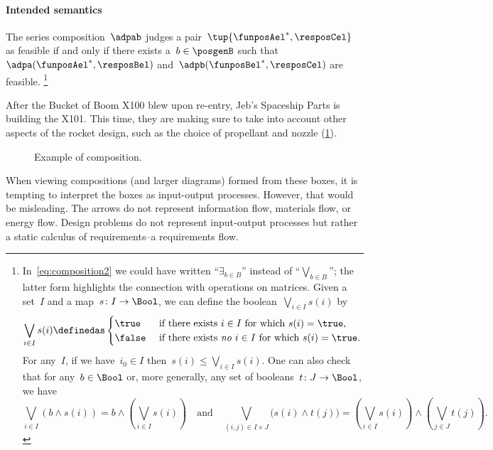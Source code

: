\paragraph{Intended semantics}
The series composition~$\adpab$ judges a pair~$\tup{\funposAel^*,\resposCel}$ as feasible if and only if there exists a~$b \in \posgenB$ such that~$\adpa(\funposAel^*,\resposBel)$ and~$\adpb(\funposBel^*,\resposCel)$ are feasible.
\footnote{In~\cref{eq:composition2} we could have written ``$\exists_{b\in B}$'' instead of ``$\bigvee_{b\in B}$''; the latter form highlights the connection with operations on matrices.
Given a set~$I$ and a map~$s\colon I\to\Bool$, we can define the boolean~$\bigvee_{i\in I}s(i)$ by
    \begin{equation*}
        \bigvee_{i\in I}s(i)\definedas
        \begin{cases}
            \true&\text{ if there exists }i\in I\text{ for which }s(i)=\true,\\
            \false&\text{ if there exists \emph{no} }i\in I\text{ for which }s(i)=\true.
        \end{cases}
    \end{equation*}
    For any~$I$, if we have~$i_0\in I$ then~$s(i)\leq\bigvee_{i\in I}s(i)$. One can also check that for any~$b\in\Bool$ or, more generally, any set of booleans~$t\colon J\to\Bool$, we have
    \begin{equation*}
        \bigvee_{i\in I}(b\wedge s(i))=b\wedge\left(\bigvee_{i\in I}s(i)\right)
        \quad\text{and}\quad
        \bigvee_{(i,j)\in I\times  J}\big(s(i)\wedge t(j)\big)=\left(\bigvee_{i\in I}s(i)\right)\wedge\left(\bigvee_{j\in J} t(j)\right).
    \end{equation*}
}

\begin{example}
    After the Bucket of Boom X100 blew upon re-entry, Jeb's Spaceship Parts is building the X101. This time, they are making sure to take into account other aspects of the rocket design, such as the choice of propellant and nozzle (\cref{fig:examplecomposition}).
    \begin{figure}[h!]
        \begin{center}
        \end{center}
        \caption{Example of composition. \label{fig:examplecomposition}}
    \end{figure}
\end{example}

\begin{remark}
    When viewing compositions (and larger diagrams) formed from these boxes, it is tempting to interpret the boxes as input-output processes.
    However, that would be misleading. The arrows do not represent information flow, materials flow, or energy flow.
    Design problems do not represent input-output processes but rather a static calculus of requirements--a requirements flow.
\end{remark}

